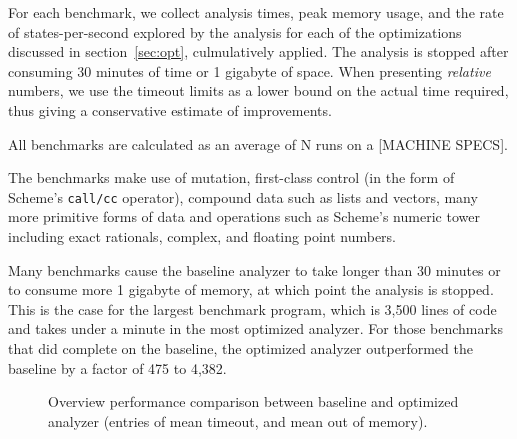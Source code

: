 \documentclass[preprint,onecolumn,9pt]{sigplanconf} %
\begin{document}
For each benchmark, we collect analysis times, peak memory usage, and
the rate of states-per-second explored by the analysis for each of the
optimizations discussed in section~\ref{sec:opt}, culmulatively
applied.  The analysis is stopped after consuming 30 minutes of time
or 1 gigabyte of space.  When presenting \emph{relative} numbers, we
use the timeout limits as a lower bound on the actual time required,
thus giving a conservative estimate of improvements.

All benchmarks are calculated as an average of N runs on a [MACHINE
  SPECS].

The benchmarks make use of mutation, first-class control (in the form
of Scheme's {\tt call/cc} operator), compound data such as lists and
vectors, many more primitive forms of data and operations such as
Scheme's numeric tower including exact rationals, complex, and
floating point numbers.

Many benchmarks cause the baseline analyzer to take longer than 30
minutes or to consume more 1 gigabyte of memory, at which point the
analysis is stopped.  This is the case for the largest benchmark
program, which is 3,500 lines of code and takes under a minute in the
most optimized analyzer.  For those benchmarks that did complete on
the baseline, the optimized analyzer outperformed the baseline by a
factor of 475 to 4,382.

\begin{figure}
\centering

\caption{Overview performance comparison between baseline and
  optimized analyzer (entries of  mean timeout, and  mean out of memory).}
\label{fig:bench-overview}
\end{figure}
\end{document}
